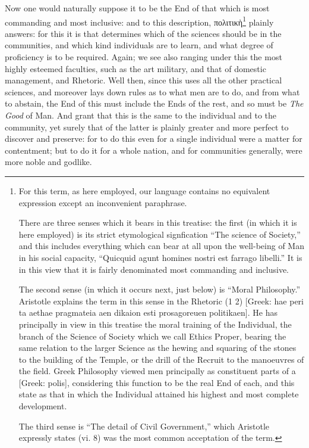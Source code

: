 Now one would naturally suppose it to be the End of that which is most
commanding and most inclusive: and to this description,
πολιτικὴ\footnote{For this term, as here employed, our language contains no equivalent expression
except an inconvenient paraphrase.

There are three senses which it bears in this treatise: the first (in which
it is here employed) is its strict etymological signfication “The science
of Society,” and this includes everything which can bear at all upon the
well-being of Man in his social capacity, “Quicquid agunt homines nostri
est farrago libelli.” It is in this view that it is fairly denominated
most commanding and inclusive.

The second sense (in which it occurs next, just below) is “Moral
Philosophy.” Aristotle explains the term in this sense in the Rhetoric (1
2) [Greek: hae peri ta aethae pragmateia aen dikaion esti prosagoreuen
politikaen]. He has principally in view in this treatise the moral training of
the Individual, the branch of the Science of Society which we call Ethics
Proper, bearing the same relation to the larger Science as the hewing and
squaring of the stones to the building of the Temple, or the drill of the
Recruit to the manoeuvres of the field. Greek Philosophy viewed men principally
as constituent parts of a [Greek: polis], considering this function to be the
real End of each, and this state as that in which the Individual attained his
highest and most complete development.

The third sense is “The detail of Civil Government,” which
Aristotle expressly states (vi. 8) was the most common acceptation of the term.}
plainly answers: for this it is that determines which of the sciences should be
in the communities, and which kind individuals are to learn, and what degree of
proficiency is to be required. Again; we see also ranging under this the most
highly esteemed faculties, such as the art military, and that of domestic
management, and Rhetoric. Well then, since this uses all the other practical
sciences, and moreover lays down rules as to what men are to do, and from what
to abstain, the End of this must include the Ends of the rest, and so must be
\emph{The Good} of Man. And grant that this is the same to the individual and
to the community, yet surely that of the latter is plainly greater and more
perfect to discover and preserve: for to do this even for a single individual
were a matter for contentment; but to do it for a whole nation, and for
communities generally, were more noble and godlike.

